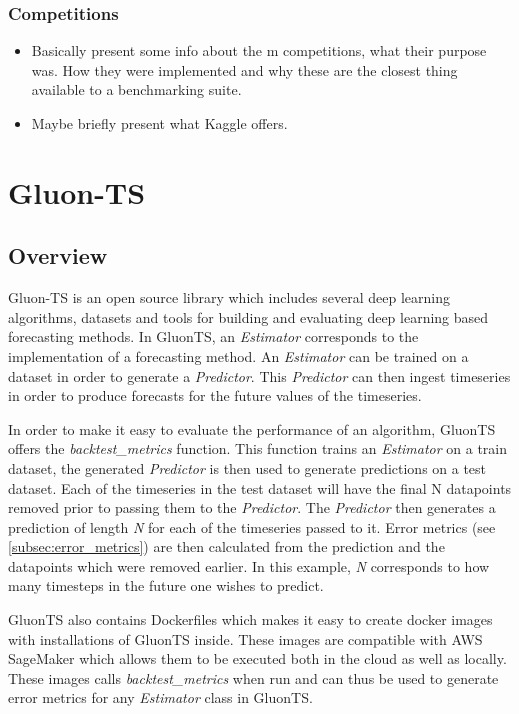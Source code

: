 \subsubsection{Competitions}
\begin{itemize}
\item Basically present some info about the m competitions, what their purpose was. How they were implemented and why these are the closest thing available to a benchmarking suite. 
\end{itemize}
\begin{itemize}
\item Maybe briefly present what Kaggle offers.
\end{itemize}

\section{Gluon-TS}
\subsection{Overview}
\label{subsec:gluonts_overview}
Gluon-TS is an open source library which includes several deep learning algorithms, datasets and tools for building and evaluating deep learning based forecasting methods. In GluonTS, an \textit{Estimator} corresponds to the implementation of a forecasting method. An \textit{Estimator} can be trained on a dataset in order to generate a \textit{Predictor}. This \textit{Predictor} can then ingest timeseries in order to produce forecasts for the future values of the timeseries. 

In order to make it easy to evaluate the performance of an algorithm, GluonTS offers the \textit{backtest\_metrics} function. This function trains an \textit{Estimator} on a train dataset, the generated \textit{Predictor} is then used to generate predictions on a test dataset. Each of the timeseries in the test dataset will have the final N datapoints removed prior to passing them to the \textit{Predictor}.  The \textit{Predictor} then generates a prediction of length \textit{N} for each of the timeseries passed to it. Error metrics (see \ref{subsec:error_metrics}) are then calculated from the prediction and the datapoints which were removed earlier. In this example, \textit{N} corresponds to how many timesteps in the future one wishes to predict. 

GluonTS also contains Dockerfiles which makes it easy to create docker images with installations of GluonTS inside. These images are compatible with AWS SageMaker which allows them to be executed both in the cloud as well as locally. These images calls \textit{backtest\_metrics} when run and can thus be used to generate error metrics for any \textit{Estimator} class in GluonTS. 

